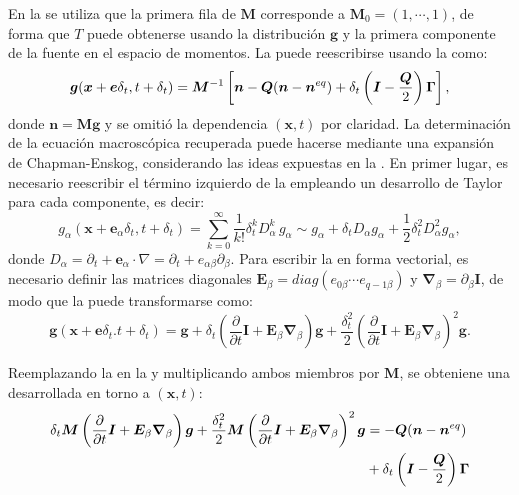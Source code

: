 En la  se utiliza que la primera fila de $\bm{M}$ corresponde a $\bm{M}_0 = (1, \cdots ,1)$, de forma que $T$ puede obtenerse usando la distribuci\'on $\bm{g}$ y la primera componente de la fuente en el espacio de momentos. La  puede reescribirse usando la  como:
\begin{equation}
	\bm{g}(\bm{x} + \bm{e} \delta_t, t+\delta_t) = \bm{M}^{-1} \left[ \bm{n} - \bm{Q}(\bm{n} - \bm{n}^{eq}) + \delta_t \left( \bm{I}-\dfrac{\bm{Q}}{2}\right) \bm{\Gamma}\right],
	\label{eq:g_model_2d}
\end{equation}
donde $\bm{n} = \bm{Mg}$ y se omiti\'o la dependencia $(\bm{x},t)$ por claridad. La determinaci\'on de la ecuaci\'on macrosc\'opica  recuperada puede hacerse mediante una expansi\'on de Chapman-Enskog, considerando las ideas expuestas en la . En primer lugar, es necesario reescribir el t\'ermino izquierdo de la  empleando un desarrollo de Taylor para cada componente, es decir:
\begin{equation}
	g_{\alpha}(\bm{x}+\bm{e}_{\alpha}\delta_t,t+\delta_t) = \sum_{k=0}^{\infty} \dfrac{1}{k!}\delta_t^k D_{\alpha}^{k} \, g_{\alpha} \sim g_{\alpha} + \delta_t D_{\alpha} g_{\alpha} + \dfrac{1}{2}\delta_t^2 D_{\alpha}^2g_{\alpha},
	\label{eq:taylor_gral}
\end{equation}
donde $D_{\alpha} = \partial_t + \bm{e}_{\alpha} \cdot \nabla=\partial_t + e_{\alpha \beta} \partial_{\beta}$. Para escribir la  en forma vectorial, es necesario definir las matrices diagonales $\bm{E}_{\beta} = diag(e_{0\beta} \cdots e_{q-1\beta})$ y $\bm{\nabla}_{\beta} = \partial_{\beta} \bm{I}$, de modo que la  puede transformarse como:
\begin{equation}
	\bm{g}(\bm{x}+\bm{e}\delta_t. t+\delta_t) = \bm{g} 
	+ \delta_t\left( \dfrac{\partial}{\partial t} \bm{I} + \bm{E}_{\beta}\bm{\nabla}_{\beta} \right) \bm{g}
	+ \dfrac{\delta^2_t}{2} \left( \dfrac{\partial}{\partial t} \bm{I} + \bm{E}_{\beta}\bm{\nabla}_{\beta} \right)^2 \bm{g}.
	\label{eq:taylor_vec}
\end{equation}

Reemplazando la  en la  y multiplicando ambos miembros por $\bm{M}$, se obteniene una \lbe{} desarrollada en torno a $(\bm{x},t)$:
\begin{equation}
	\begin{aligned}
	\delta_t \bm{M}\left( \dfrac{\partial}{\partial t} \bm{I} + \bm{E}_{\beta}\bm{\nabla}_{\beta} \right) \bm{g} + \dfrac{\delta^2_t}{2} \bm{M}\left( \dfrac{\partial}{\partial t} \bm{I} + \bm{E}_{\beta}\bm{\nabla}_{\beta} \right)^2 \bm{g} 
	&= -\bm{Q}(\bm{n} - \bm{n}^{eq}) \\
	& + \delta_t \left( \bm{I}-\dfrac{\bm{Q}}{2}\right) \bm{\Gamma}
	\end{aligned}
	\label{eq:taylor_vec_2}
\end{equation}

